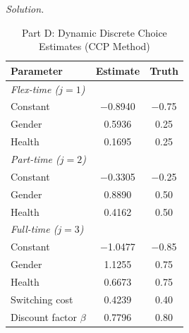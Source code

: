 \documentclass[11pt]{article}
\newcounter{q}
\newenvironment{solution}{%
  \vspace{0.15em}
  \noindent\textit{Solution. }\ignorespaces
}{\vspace{0.5em}\par}
\newcommand{\1}{\mathbf{1}}
\begin{document}
\begin{solution}
\begin{table}[h!]
  \centering
  \begin{threeparttable}
  \caption{Part D: Dynamic Discrete Choice Estimates (CCP Method)}
    \begin{tabular}{lcc}
      \toprule
      Parameter & Estimate & Truth \\
      \midrule
      \multicolumn{4}{l}{\textit{Flex-time ($j=1$)}} \\
      \quad Constant & $-$0.8940 & $-$0.75 \\
      \quad Gender   &    0.5936 &    0.25 \\
      \quad Health   &    0.1695 &    0.25 \\
      \midrule
      \multicolumn{4}{l}{\textit{Part-time ($j=2$)}} \\
      \quad Constant & $-$0.3305 & $-$0.25 \\
      \quad Gender   &    0.8890 &    0.50 \\
      \quad Health   &    0.4162 &    0.50 \\
      \midrule
      \multicolumn{4}{l}{\textit{Full-time ($j=3$)}} \\
      \quad Constant & $-$1.0477  & $-$0.85 \\
      \quad Gender   &    1.1255  &    0.75 \\
      \quad Health   &    0.6673  &    0.75 \\
      \midrule
      Switching cost          & 0.4239 & 0.40 \\
      Discount factor $\beta$ & 0.7796 & 0.80 \\
      \bottomrule
    \end{tabular}
  \end{threeparttable}
\end{table}
\end{solution}
\end{document}
